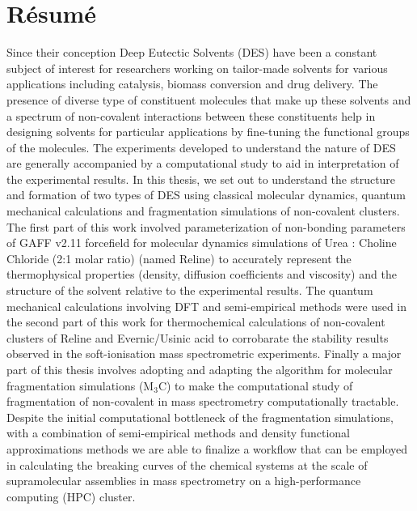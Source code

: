\section*{Résumé}
\label{sec:summary}
Since their conception Deep Eutectic Solvents (DES) have been a constant subject of interest for researchers working on tailor-made solvents for various applications including catalysis, biomass conversion and drug delivery.
The presence of diverse type of constituent molecules that make up these solvents and a spectrum of non-covalent interactions between these constituents help in designing solvents for particular applications by fine-tuning the functional groups of the molecules.
The experiments developed to understand the nature of DES are generally accompanied by a computational study to aid in interpretation of the experimental results.
In this thesis, we set out to understand the structure and formation of two types of DES using classical molecular dynamics, quantum mechanical calculations and fragmentation simulations of non-covalent clusters.
The first part of this work involved parameterization of non-bonding parameters of GAFF v2.11 forcefield for molecular dynamics simulations of Urea : Choline Chloride (2:1 molar ratio) (named Reline) to accurately represent the thermophysical properties (density, diffusion coefficients and viscosity) and the structure of the solvent relative to the experimental results. 
The quantum mechanical calculations involving DFT and semi-empirical methods were used in the second part of this work for thermochemical calculations of non-covalent clusters of Reline and Evernic/Usinic acid to corrobarate the stability results observed in the soft-ionisation mass spectrometric experiments.
Finally a major part of this thesis involves adopting and adapting the algorithm for molecular fragmentation simulations (M$_{3}$C) to make the computational study of fragmentation of non-covalent in mass spectrometry computationally tractable. Despite the initial computational bottleneck of the fragmentation simulations, with a combination of semi-empirical methods and density functional approximations methods we are able to finalize a workflow that can be employed in calculating the breaking curves of the chemical systems at the scale of supramolecular assemblies in mass spectrometry on a high-performance computing (HPC) cluster.
